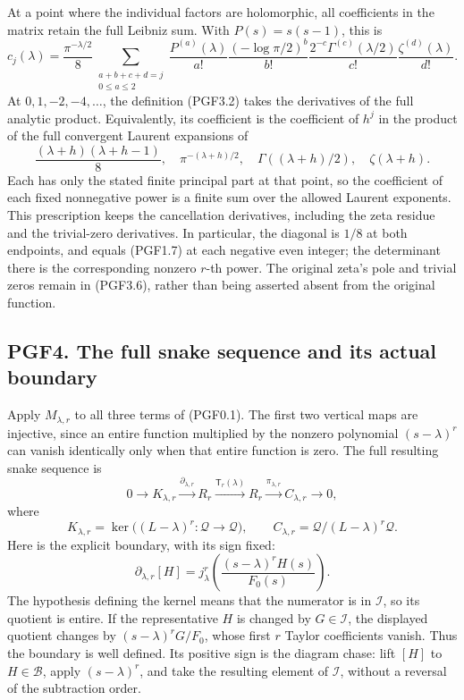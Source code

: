 At a point where the individual factors are holomorphic, all
coefficients in the matrix retain the full Leibniz sum. With
\(P(s)=s(s-1)\), this is \[
c_j(\lambda)=\frac{\pi^{-\lambda/2}}8
\sum_{\substack{a+b+c+d=j\\0\le a\le2}}
\frac{P^{(a)}(\lambda)}{a!}
\frac{(-\log\pi/2)^b}{b!}
\frac{2^{-c}\Gamma^{(c)}(\lambda/2)}{c!}
\frac{\zeta^{(d)}(\lambda)}{d!}.
\tag{PGF3.5}
\] At \(0,1,-2,-4,\ldots\), the definition (PGF3.2) takes the
derivatives of the full analytic product. Equivalently, its coefficient
is the coefficient of \(h^j\) in the product of the full convergent
Laurent expansions of \[
\frac{(\lambda+h)(\lambda+h-1)}8,
\quad \pi^{-(\lambda+h)/2},
\quad\Gamma((\lambda+h)/2),
\quad\zeta(\lambda+h).
\tag{PGF3.6}
\] Each has only the stated finite principal part at that point, so the
coefficient of each fixed nonnegative power is a finite sum over the
allowed Laurent exponents. This prescription keeps the cancellation
derivatives, including the zeta residue and the trivial-zero
derivatives. In particular, the diagonal is \(1/8\) at both endpoints,
and equals (PGF1.7) at each negative even integer; the determinant there
is the corresponding nonzero \(r\)-th power. The original zeta's pole
and trivial zeros remain in (PGF3.6), rather than being asserted absent
from the original function.

\subsection{PGF4. The full snake sequence and its actual
boundary}\label{pgf4.-the-full-snake-sequence-and-its-actual-boundary}

Apply \(M_{\lambda,r}\) to all three terms of (PGF0.1). The first two
vertical maps are injective, since an entire function multiplied by the
nonzero polynomial \((s-\lambda)^r\) can vanish identically only when
that entire function is zero. The full resulting snake sequence is \[
0\longrightarrow K_{\lambda,r}
\xrightarrow{\partial_{\lambda,r}} R_r
\xrightarrow{\mathsf T_r(\lambda)}R_r
\xrightarrow{\pi_{\lambda,r}}C_{\lambda,r}
\longrightarrow0,
\tag{PGF4.1}
\] where \[
K_{\lambda,r}=\ker\bigl((L-\lambda)^r:\mathcal Q\to\mathcal Q\bigr),
\qquad
C_{\lambda,r}=\mathcal Q/(L-\lambda)^r\mathcal Q.
\tag{PGF4.2}
\] Here is the explicit boundary, with its sign fixed: \[
\boxed{\quad
\partial_{\lambda,r}[H]
=j^r_\lambda\!\left(\frac{(s-\lambda)^rH(s)}{F_0(s)}\right).
\quad}
\tag{PGF4.3}
\] The hypothesis defining the kernel means that the numerator is in
\(\mathcal I\), so its quotient is entire. If the representative \(H\)
is changed by \(G\in\mathcal I\), the displayed quotient changes by
\((s-\lambda)^rG/F_0\), whose first \(r\) Taylor coefficients vanish.
Thus the boundary is well defined. Its positive sign is the diagram
chase: lift \([H]\) to \(H\in\mathcal B\), apply \((s-\lambda)^r\), and
take the resulting element of \(\mathcal I\), without a reversal of the
subtraction order.

